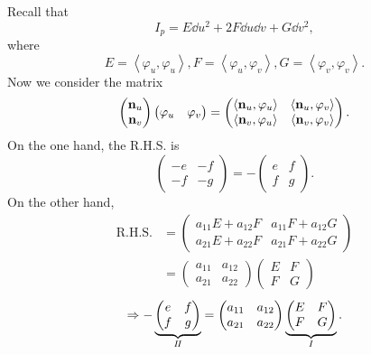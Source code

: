 Recall that 
\[
    I_p=E\dd u^2+2F \dd u\dd v+G\dd v^2,
\]
where
\[
    E=\left\langle\varphi_u,\varphi_u\right\rangle,
    F=\left\langle\varphi_u,\varphi_v\right\rangle,
    G=\left\langle\varphi_v,\varphi_v\right\rangle.    
\]
Now we consider the matrix 
\[
    \begin{pmatrix}
        \vb{n}_u\\
        \vb{n}_v
    \end{pmatrix}
    \begin{pmatrix}
        \varphi_u &\varphi_v
    \end{pmatrix}=
    \begin{pmatrix}
        \left\langle\vb{n}_u,\varphi_u\right\rangle&
        \left\langle\vb{n}_u,\varphi_v\right\rangle\\
        \left\langle\vb{n}_v,\varphi_u\right\rangle&
        \left\langle\vb{n}_v,\varphi_v\right\rangle
    \end{pmatrix}.    
\]
On the one hand, the R.H.S. is 
\[
    \begin{pmatrix}
    -e&-f\\
    -f&-g
    \end{pmatrix}=-
    \begin{pmatrix}
        e&f\\
        f&g
    \end{pmatrix}.
\]
On the other hand,
\begin{align*}
    \text{R.H.S.}&=\begin{pmatrix}
        a_{11}E+a_{12}F&
        a_{11}F+a_{12}G\\
        a_{21}E+a_{22}F&
        a_{21}F+a_{22}G
    \end{pmatrix}\\
    &=\begin{pmatrix}
        a_{11}&a_{12}\\
        a_{21}&a_{22}
    \end{pmatrix}
    \begin{pmatrix}
        E&F\\
        F&G
    \end{pmatrix}
\end{align*}
\[
    \Rightarrow 
    -\underbrace{\begin{pmatrix}
        e&f\\
        f&g
    \end{pmatrix}}_{I\!I}
    =
    \begin{pmatrix}
        a_{11}&a_{12}\\
        a_{21}&a_{22}
    \end{pmatrix}
    \underbrace{\begin{pmatrix}
        E&F\\
        F&G
    \end{pmatrix}}_{I}.
\]
